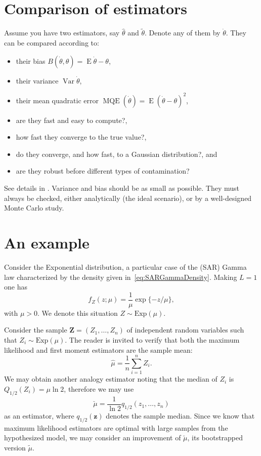 \section{Comparison of estimators}

Assume you have two estimators, say $\widehat{\theta}$ and $\widetilde{\theta}$.
Denote any of them by $\dot\theta$.
They can be compared according to:
\begin{itemize}
\item their bias $B(\dot{\theta},\theta)=\operatorname{E}\dot\theta-\theta$,
\item their variance $\operatorname{Var}\dot{\theta}$,
\item their mean quadratic error $\operatorname{MQE}(\dot{\theta}) = \operatorname{E}(\dot{\theta}-\theta)^2$,
\item are they fast and easy to compute?,
\item how fast they converge to the true value?,
\item do they converge, and how fast, to a Gaussian distribution?, and
\item are they robust before different types of contamination?
\end{itemize}
See details in \citet{busto92}.
Variance and bias should be as small as possible.
They must always be checked, either analytically (the ideal scenario), or by a well-designed Monte Carlo study.

\section{An example}

Consider the Exponential distribution, a particular case of the (SAR) Gamma law characterized by the density given in~\eqref{eq:SARGammaDensity}.
Making $L=1$ one has
\begin{equation}
f_Z(z;\mu) = \frac{1}{\mu} \exp\{-z/\mu\},
\label{eq:ExpDensity}
\end{equation}
with $\mu>0$.
We denote this situation $Z\sim \text{Exp}(\mu)$.

Consider the sample $\bm Z=(Z_1,\dots,Z_n)$ of independent random variables such that $Z_i\sim \text{Exp}(\mu)$.
The reader is invited to verify that both the maximum likelihood and first moment estimators are the sample mean:
\begin{equation}
\widehat\mu = \frac{1}{n}\sum_{i=1}^n Z_i.
\end{equation}
We may obtain another analogy estimator noting that the median of $Z_i$ is $Q_{1/2}(Z_i)=\mu\ln 2$, therefore we may use
\begin{equation}
\breve{\mu} = \frac{1}{\ln 2} q_{1/2} (z_1,\dots,z_n)
\end{equation}
as an estimator, where $q_{1/2}(\bm z)$ denotes the sample median.
Since we know that maximum likelihood estimators are optimal with large samples from the hypothesized model, we may consider an improvement of $\breve{\mu}$, its bootstrapped version $\widetilde{\mu}$.

